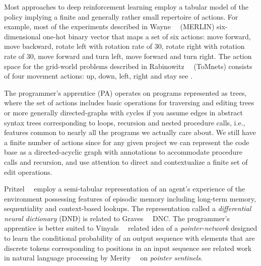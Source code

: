 Most approaches to deep reinforcement learning employ a tabular model of the policy implying a finite \emdash{} and generally rather small \emdash{} repertoire of actions. For example, most of the experiments described in Wayne~\etal{}~\cite{WayneetalCoRR-18} (MERLIN) six-dimensional one-hot binary vector that maps a set of six actions: move forward, move backward, rotate left with rotation rate of 30, rotate right with rotation rate of 30, move forward and turn left, move forward and turn right. The action space for the grid-world problems described in Rabinowitz~\etal{}~\cite{RabinowitzetalCoRR-18} (ToMnets) consists of four movement actions: up, down, left, right and stay \emdash{} see {{}}.

The programmer's apprentice (PA) operates on programs represented as trees, where the set of actions includes basic operations for traversing and editing trees \emdash{} or more generally directed-graphs with cycles if you assume edges in abstract syntax trees corresponding to loops, recursion and nested procedure calls, i.e., features common to nearly all the programs we actually care about. We still have a finite number of actions since for any given project we can represent the code base as a directed-acyclic graph with annotations to accommodate procedure calls and recursion, and use attention to direct and contextualize a finite set of edit operations.

Pritzel~\etal{}~\cite{PritzeletalCoRR-17} employ a semi-tabular representation of an agent's experience of the environment possessing features of episodic memory including long-term memory, sequentiality and context-based lookups. The representation called a {\it{differential neural dictionary}} (DND) is related to Graves~\etal{}~\cite{GravesetalNATURE-16} DNC. The programmer's apprentice is better suited to Vinyals~\etal{}~\cite{VinyalsetalNIPS-15} related idea of a {\it{pointer-network}} designed to learn the conditional probability of an output sequence with elements that are discrete tokens corresponding to positions in an input sequence \emdash{} see related work in natural language processing by Merity~\etal{}~\cite{MerityetalCoRR-16} on {\it{pointer sentinels}}.


\setcounter{figure}{1}

